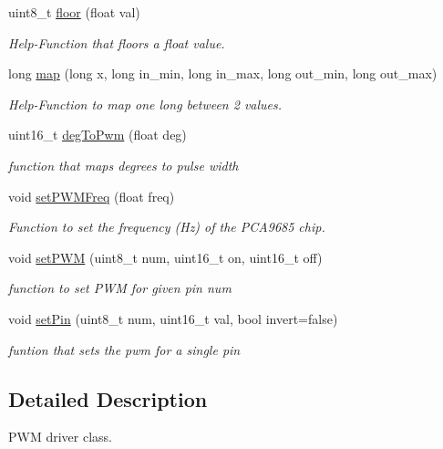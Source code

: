 \begin{DoxyCompactItemize}
uint8\+\_\+t \hyperlink{classPWMDriver_a16751ee4ff51c2deda6f9c4efbc8c869}{floor} (float val)
\begin{DoxyCompactList}\small\item\em Help-\/\+Function that floors a float value. \end{DoxyCompactList}\item 
long \hyperlink{classPWMDriver_a9f1afb5b4d6bf18bb2c4b591f310a149}{map} (long x, long in\+\_\+min, long in\+\_\+max, long out\+\_\+min, long out\+\_\+max)
\begin{DoxyCompactList}\small\item\em Help-\/\+Function to map one long between 2 values. \end{DoxyCompactList}\item 
\mbox{\label{classPWMDriver_aaeded52492e2cf39770492d71fd3b161}} 
uint16\+\_\+t \hyperlink{classPWMDriver_aaeded52492e2cf39770492d71fd3b161}{deg\+To\+Pwm} (float deg)
\begin{DoxyCompactList}\small\item\em function that maps degrees to pulse width \end{DoxyCompactList}\item 
void \hyperlink{classPWMDriver_ae52eb9cef15ce7bec9acef557e08f47e}{set\+P\+W\+M\+Freq} (float freq)
\begin{DoxyCompactList}\small\item\em Function to set the frequency (Hz) of the P\+C\+A9685 chip. \end{DoxyCompactList}\item 
void \hyperlink{classPWMDriver_a5c94a2f5ea34ba2cd3af6b589b82590c}{set\+P\+WM} (uint8\+\_\+t num, uint16\+\_\+t on, uint16\+\_\+t off)
\begin{DoxyCompactList}\small\item\em function to set P\+WM for given pin num \end{DoxyCompactList}\item 
void \hyperlink{classPWMDriver_a2046fc4de1b6000aa02d3fb4eae8a3e9}{set\+Pin} (uint8\+\_\+t num, uint16\+\_\+t val, bool invert=false)
\begin{DoxyCompactList}\small\item\em funtion that sets the pwm for a single pin \end{DoxyCompactList}\end{DoxyCompactItemize}


\subsection{Detailed Description}
P\+WM driver class. 

